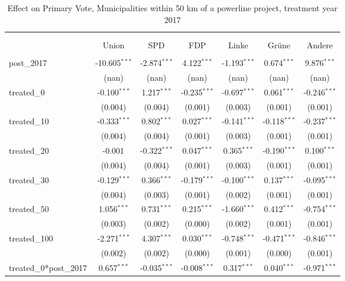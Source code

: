 \begin{table}[!htbp] \centering
  \caption{Effect on Primary Vote, Municipalities within 50 km of a powerline project, treatment year 2017}
\begin{tabular}{@{\extracolsep{5pt}}lcccccc}
\\[-1.8ex]\hline
\hline \\[-1.8ex]
\\[-1.8ex] & \multicolumn{1}{c}{Union} & \multicolumn{1}{c}{SPD} & \multicolumn{1}{c}{FDP} & \multicolumn{1}{c}{Linke} & \multicolumn{1}{c}{Grüne} & \multicolumn{1}{c}{Andere}  \\
\hline \\[-1.8ex]
 post_2017 & -10.605$^{***}$ & -2.874$^{***}$ & 4.122$^{***}$ & -1.193$^{***}$ & 0.674$^{***}$ & 9.876$^{***}$ \\
  & (nan) & (nan) & (nan) & (nan) & (nan) & (nan) \\
 treated_0 & -0.100$^{***}$ & 1.217$^{***}$ & -0.235$^{***}$ & -0.697$^{***}$ & 0.061$^{***}$ & -0.246$^{***}$ \\
  & (0.004) & (0.004) & (0.001) & (0.003) & (0.001) & (0.001) \\
 treated_10 & -0.333$^{***}$ & 0.802$^{***}$ & 0.027$^{***}$ & -0.141$^{***}$ & -0.118$^{***}$ & -0.237$^{***}$ \\
  & (0.004) & (0.004) & (0.001) & (0.003) & (0.001) & (0.001) \\
 treated_20 & -0.001$^{}$ & -0.322$^{***}$ & 0.047$^{***}$ & 0.365$^{***}$ & -0.190$^{***}$ & 0.100$^{***}$ \\
  & (0.004) & (0.004) & (0.001) & (0.003) & (0.001) & (0.001) \\
 treated_30 & -0.129$^{***}$ & 0.366$^{***}$ & -0.179$^{***}$ & -0.100$^{***}$ & 0.137$^{***}$ & -0.095$^{***}$ \\
  & (0.004) & (0.003) & (0.001) & (0.002) & (0.001) & (0.001) \\
 treated_50 & 1.056$^{***}$ & 0.731$^{***}$ & 0.215$^{***}$ & -1.660$^{***}$ & 0.412$^{***}$ & -0.754$^{***}$ \\
  & (0.003) & (0.002) & (0.000) & (0.002) & (0.001) & (0.001) \\
 treated_100 & -2.271$^{***}$ & 4.307$^{***}$ & 0.030$^{***}$ & -0.748$^{***}$ & -0.471$^{***}$ & -0.846$^{***}$ \\
  & (0.002) & (0.002) & (0.000) & (0.001) & (0.000) & (0.001) \\
 treated_0*post_2017 & 0.657$^{***}$ & -0.035$^{***}$ & -0.008$^{***}$ & 0.317$^{***}$ & 0.040$^{***}$ & -0.971$^{***}$ \\

\end{tabular}
\end{table}
